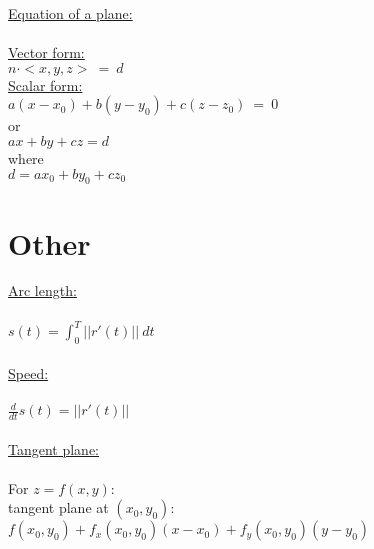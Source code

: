 \documentclass[12pt]{article}
\begin{document}
\noindent
\underline{Equation of a plane:}\\\\
\underline{Vector form:}\\
$n \cdot <x,y,z> \ = \ d$\\

\noindent
\underline{Scalar form:}\\
$a(x-x_0) + b(y-y_0) + c(z-z_0) \ = \ 0$\\
\indent or\\
$ax+by+cz = d$\\
\indent where\\
$d = ax_0 + by_0 + cz_0$

\clearpage

\section*{Other}
\noindent
\underline{Arc length:}\\\\
$
s(t) = \int_0^T ||r'(t)|| \ dt
$\\\\
\noindent
\underline{Speed:}\\\\
$
\frac{d}{dt}s(t) = ||r'(t)||
$\\\\
\underline{Tangent plane:}\\\\
For $z = f(x,y)$:\\
\indent
tangent plane at $(x_0,y_0)$: $f(x_0,y_0)+f_x(x_0,y_0)(x-x_0)+f_y(x_0,y_0)(y-y_0)$\\
\\\\
\end{document}
